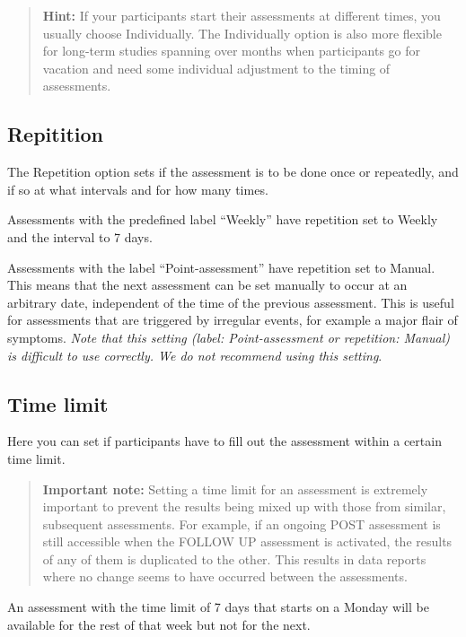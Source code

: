 \documentclass[
]{book}
\begin{document}
\begin{quote}
\textbf{Hint:} If your participants start their assessments at different times, you usually choose Individually. The Individually option is also more flexible for long-term studies spanning over months when participants go for vacation and need some individual adjustment to the timing of assessments.
\end{quote}

\subsection{Repitition}\label{repitition}

The Repetition option sets if the assessment is to be done once or repeatedly, and if so at what intervals and for how many times.

Assessments with the predefined label ``Weekly'' have repetition set to Weekly and the interval to 7 days.

Assessments with the label ``Point-assessment'' have repetition set to Manual. This means that the next assessment can be set manually to occur at an arbitrary date, independent of the time of the previous assessment. This is useful for assessments that are triggered by irregular events, for example a major flair of symptoms. \emph{Note that this setting (label: Point-assessment or repetition: Manual) is difficult to use correctly. We do not recommend using this setting}.

\subsection{Time limit}\label{time-limit}

Here you can set if participants have to fill out the assessment within a certain time limit.

\begin{quote}
\textbf{Important note:} Setting a time limit for an assessment is extremely important to prevent the results being mixed up with those from similar, subsequent assessments. For example, if an ongoing POST assessment is still accessible when the FOLLOW UP assessment is activated, the results of any of them is duplicated to the other. This results in data reports where no change seems to have occurred between the assessments.
\end{quote}

An assessment with the time limit of 7 days that starts on a Monday will be available for the rest of that week but not for the next.
\end{document}
